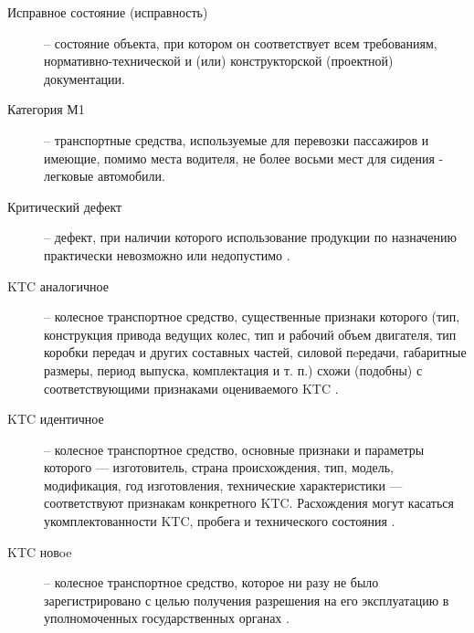 \begin{description}
	\item
	[Исправное состояние (исправность)] -- состояние объекта, при котором он соответствует всем требованиям, нормативно-технической и (или) конструкторской (проектной) документации.
	\item
	[Категория М1] -- транспортные средства, используемые для перевозки пассажиров и имеющие, помимо места водителя, не более восьми мест для сидения - легковые автомобили.
	\item
	[Критический дефект] -- дефект, при наличии которого использование продукции по назначению 	практически невозможно или недопустимо \cite{15467:gost}.
	\item
	[KTC аналогичное]  -- колесное транспортное средство, существенные признаки которого (тип, конструкция привода ведущих колес, тип и рабочий объем двигателя, тип коробки передач и других составных частей, силовой пeредачи, габаритные размеры, период выпуска, комплектация и т. п.) схожи (подобны) с соответствующими признаками оцениваемого KTC \cite[часть III, п.1.2]{minust:2018}.
	\item
	[KTC идентичное]  -- колесное транспортное средство, основные признаки и параметры которого — изготовитель, страна происхождения, тип, модель, модификация,  год изготовления,  технические  характеристики —   соответствуют признакам конкретного KTC. Расхождения могут касаться укомплектованности KTC, пробега и технического состояния \cite[часть III, п. 1.2]{minust:2018}.
	\item
	[KTC новoe]  -- колесное транспортное средство, которое ни разу не было зарегистрировано с целью получения разрешения на его эксплуатацию в уполномоченных государственных органах \cite[часть III, п. 1.2]{minust:2018}.

\end{description}
